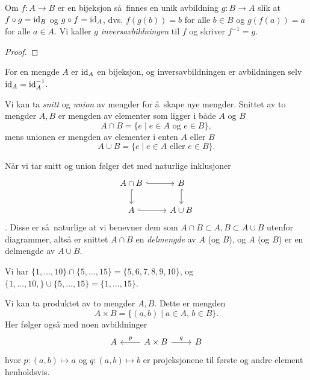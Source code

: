 \begin{lemma}
    Om $f\colon A\to B$ er en bijeksjon så finnes en unik avbildning
    $g\colon B\to A$ slik at $f\circ g = \operatorname{id}_B$ og $g\circ f = \operatorname{id}_A$,
    dvs.
    $f(g(b)) = b$ for alle $b\in B$ og $g(f(a)) = a$ for alle $a\in A$.
    Vi kaller $g$ \textit{inversavbildningen} til $f$ og skriver $f^{-1} = g$.
\end{lemma}
\begin{proof}
\end{proof}

\begin{example}
    For en mengde $A$ er $\operatorname{id}_A$ en bijeksjon,
    og inversavbildningen er avbildningen selv $\operatorname{id}_A = \operatorname{id}_A^{-1}$.
\end{example}

\begin{example}
    Vi kan ta \textit{snitt} og \textit{union} av mengder for å skape nye mengder.
    Snittet av to mengder $A,B$ er mengden av elementer som ligger i både $A$ og $B$
    \[
        A\cap B = \{ e\mid e\in A\mbox{ og } e\in B\},
    \]
    mens unionen er mengden av elementer i enten $A$ eller $B$
    \[
        A\cup B = \{ e\mid e\in A\mbox{ eller } e\in B\}.
    \]

    Når vi tar snitt og union følger det med naturlige inklusjoner
    \[\begin{tikzcd}
        A\cap B
        \rar[hook]
        \dar[hook]
        & B
        \dar[hook]
        \\
        A
        \rar[hook]
        &
        A\cup B
    \end{tikzcd}\].
    Disse er så naturlige at vi benevner dem som $A\cap B\subset A,B\subset A\cup B$
    utenfor diagrammer, altså er snittet $A\cap B$
    en \textit{delmengde} av $A$ (og $B$),
    og $A$ (og $B$) er en delmengde av $A\cup B$.
\end{example}

\begin{example}
    Vi har $\{1,\dots,10\}\cap \{5,\dots,15\} = \{5, 6, 7, 8, 9, 10\}$,
    og $\{1,\dots, 10,\}\cup \{5,\dots, 15\} = \{1,\dots, 15\}$.
\end{example}

\begin{example}
    Vi kan ta produktet av to mengder $A, B$.
    Dette er mengden
    \[
        A\times B = \{
            (a,b)\mid a\in A,\, b\in B
        \}.
    \]
    Her følger også med noen avbildninger
    \[\begin{tikzcd}
        A
        \rar[<-]{p}
        &
        A\times B
        \rar{q}
        &
        B
    \end{tikzcd}\]
    hvor $p\colon (a,b)\mapsto a$ og $q\colon (a,b)\mapsto b$ er
    projeksjonene til første og andre element henholdsvis.
\end{example}

